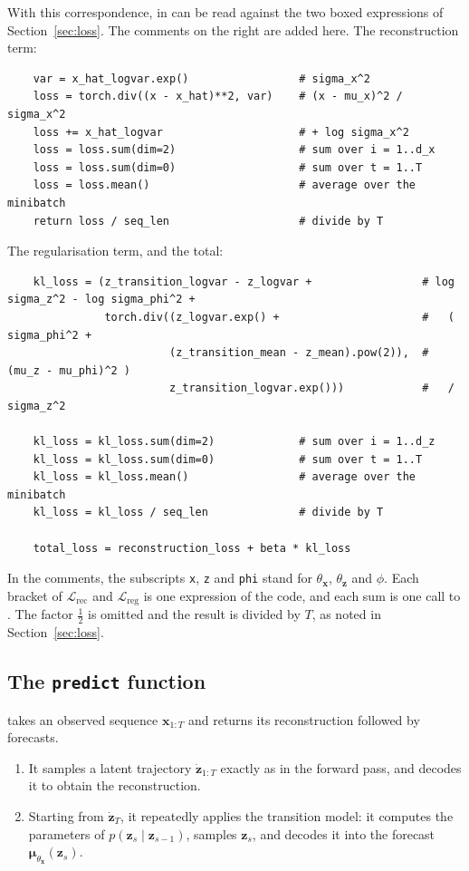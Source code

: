 With this correspondence,  in
 can be read against the two boxed
expressions of Section~\ref{sec:loss}. The comments on the right are
added here. The reconstruction term:
{\small
\begin{verbatim}
    var = x_hat_logvar.exp()                 # sigma_x^2
    loss = torch.div((x - x_hat)**2, var)    # (x - mu_x)^2 / sigma_x^2
    loss += x_hat_logvar                     # + log sigma_x^2
    loss = loss.sum(dim=2)                   # sum over i = 1..d_x
    loss = loss.sum(dim=0)                   # sum over t = 1..T
    loss = loss.mean()                       # average over the minibatch
    return loss / seq_len                    # divide by T
\end{verbatim}
}
\noindent The regularisation term, and the total:
{\small
\begin{verbatim}
    kl_loss = (z_transition_logvar - z_logvar +                 # log sigma_z^2 - log sigma_phi^2 +
               torch.div((z_logvar.exp() +                      #   ( sigma_phi^2 +
                         (z_transition_mean - z_mean).pow(2)),  #     (mu_z - mu_phi)^2 )
                         z_transition_logvar.exp()))            #   / sigma_z^2

    kl_loss = kl_loss.sum(dim=2)             # sum over i = 1..d_z
    kl_loss = kl_loss.sum(dim=0)             # sum over t = 1..T
    kl_loss = kl_loss.mean()                 # average over the minibatch
    kl_loss = kl_loss / seq_len              # divide by T

    total_loss = reconstruction_loss + beta * kl_loss
\end{verbatim}
}
\noindent In the comments, the subscripts \texttt{x}, \texttt{z} and
\texttt{phi} stand for $\theta_{\mathbf{x}}$, $\theta_{\mathbf{z}}$ and
$\phi$. Each bracket of $\mathcal{L}_{\text{rec}}$ and
$\mathcal{L}_{\text{reg}}$ is one expression of the code, and each sum
is one call to . The factor $\frac{1}{2}$ is omitted and the
result is divided by $T$, as noted in Section~\ref{sec:loss}.

\subsection{The \texttt{predict} function}

 takes an observed sequence $\mathbf{x}_{1:T}$ and returns
its reconstruction followed by  forecasts.
\begin{enumerate}
    \item It samples a latent trajectory $\dot{\mathbf{z}}_{1:T}$ exactly
    as in the forward pass, and decodes it to obtain the
    reconstruction.
    \item Starting from $\dot{\mathbf{z}}_T$, it repeatedly applies the
    transition model: it computes the parameters of
    $p(\mathbf{z}_{s} \mid \mathbf{z}_{s-1})$, samples
    $\mathbf{z}_{s}$, and decodes it into the forecast
    $\boldsymbol{\mu}_{\theta_{\mathbf{x}}}(\mathbf{z}_s)$.
\end{enumerate}

